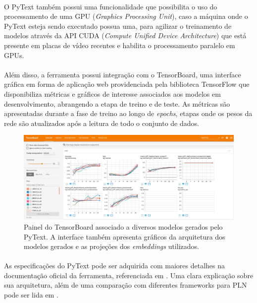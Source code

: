 \documentclass[grad,numbers]{coppe}
\begin{document}
		\paragraph{}O PyText também possui uma funcionalidade que possibilita o uso do  processamento de uma GPU (\textit{Graphics Processing Unit}), caso a máquina onde o PyText esteja sendo executado possua uma, para agilizar o treinamento de modelos através da API CUDA (\textit{Compute Unified Device Architecture}) que está presente em placas de vídeo recentes e habilita o processamento paralelo em GPUs.
		\paragraph{}Além disso, a ferramenta possui integração com o TensorBoard, uma interface gráfica em forma de aplicação web providenciada pela biblioteca TensorFlow que disponibiliza métricas e gráficos de interesse associados aos modelos em desenvolvimento, abrangendo a etapa de treino e de teste. As métricas são apresentadas durante a fase de treino ao longo de \textit{epochs}, etapas onde os pesos da rede são atualizados após a leitura de todo o conjunto de dados.
 		\begin{figure}[h]
			{\includegraphics[width=15cm]{tensorboard-panel.jpg}
				\caption{Painel do TensorBoard associado a diversos modelos gerados pelo PyText. A interface também apresenta gráficos da arquitetura dos modelos gerados e as projeções dos \textit{embeddings} utilizados.}
				\label{fig:tensorboard-panel-fig}}
		\end{figure}
  	\paragraph{}As especificações do PyText pode ser adquirida com maiores detalhes na documentação oficial da ferramenta, referenciada em \cite{pyText-documentation}. Uma clara explicação sobre sua arquitetura, além de uma comparação com diferentes frameworks para PLN pode ser lida em \cite{vinicius-pytext}.
\end{document}
